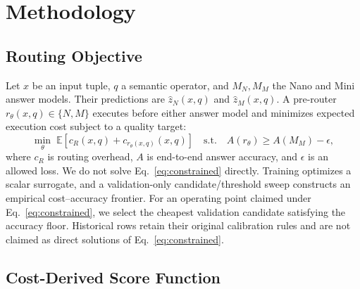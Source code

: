 \section{Methodology}
\label{sec:method}

\subsection{Routing Objective}

Let $x$ be an input tuple, $q$ a semantic operator, and $M_N,M_M$ the Nano and
Mini answer models. Their predictions are $\hat{z}_N(x,q)$ and
$\hat{z}_M(x,q)$. A pre-router $r_\theta(x,q)\in\{N,M\}$ executes before either
answer model and minimizes expected execution cost subject to a quality target:
\begin{equation}
  \min_\theta\; \mathbb{E}[c_R(x,q)+c_{r_\theta(x,q)}(x,q)]
  \quad\text{s.t.}\quad
  A(r_\theta) \ge A(M_M)-\epsilon,
  \label{eq:constrained}
\end{equation}
where $c_R$ is routing overhead, $A$ is end-to-end answer accuracy, and
$\epsilon$ is an allowed loss. We do not solve Eq.~\ref{eq:constrained}
directly. Training optimizes a scalar surrogate, and a validation-only
candidate/threshold sweep constructs an empirical cost--accuracy frontier. For
an operating point claimed under Eq.~\ref{eq:constrained}, we select the
cheapest validation candidate satisfying the accuracy floor. Historical rows
retain their original calibration rules and are not claimed as direct
solutions of Eq.~\ref{eq:constrained}.

\subsection{Cost-Derived Score Function}

